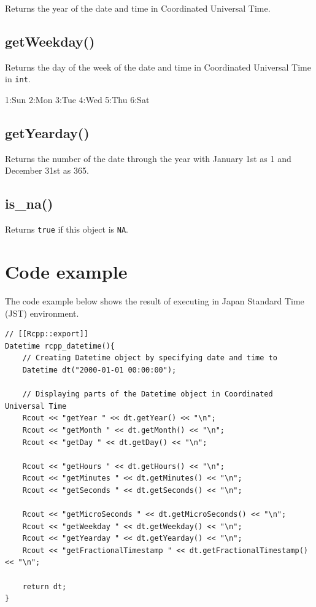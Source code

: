 \documentclass[
]{book}
\begin{document}
Returns the year of the date and time in Coordinated Universal Time.

\hypertarget{getweekday}{%
\subsection{getWeekday()}\label{getweekday}}

Returns the day of the week of the date and time in Coordinated Universal Time in \texttt{int}.

1:Sun 2:Mon 3:Tue 4:Wed 5:Thu 6:Sat

\hypertarget{getyearday}{%
\subsection{getYearday()}\label{getyearday}}

Returns the number of the date through the year with January 1st as 1 and December 31st as 365.

\hypertarget{is_na}{%
\subsection{is\_na()}\label{is_na}}

Returns \texttt{true} if this object is \texttt{NA}.

\hypertarget{code-example}{%
\section{Code example}\label{code-example}}

The code example below shows the result of executing in Japan Standard Time (JST) environment.

\begin{verbatim}
// [[Rcpp::export]]
Datetime rcpp_datetime(){
    // Creating Datetime object by specifying date and time to
    Datetime dt("2000-01-01 00:00:00");

    // Displaying parts of the Datetime object in Coordinated Universal Time
    Rcout << "getYear " << dt.getYear() << "\n";
    Rcout << "getMonth " << dt.getMonth() << "\n";
    Rcout << "getDay " << dt.getDay() << "\n";

    Rcout << "getHours " << dt.getHours() << "\n";
    Rcout << "getMinutes " << dt.getMinutes() << "\n";
    Rcout << "getSeconds " << dt.getSeconds() << "\n";

    Rcout << "getMicroSeconds " << dt.getMicroSeconds() << "\n";
    Rcout << "getWeekday " << dt.getWeekday() << "\n";
    Rcout << "getYearday " << dt.getYearday() << "\n";
    Rcout << "getFractionalTimestamp " << dt.getFractionalTimestamp() << "\n";

    return dt;
}
\end{verbatim}
\end{document}
